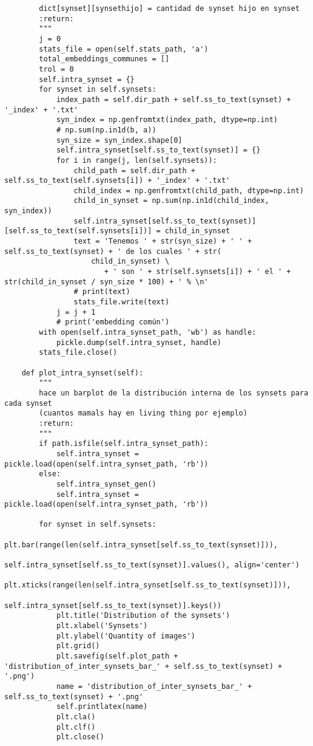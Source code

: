 \documentclass[12,twoside]{TFG-GM}
\theoremstyle{definition}
\theoremstyle{remark}
\begin{document}
\begin{verbatim}
        dict[synset][synsethijo] = cantidad de synset hijo en synset
        :return:
        """
        j = 0
        stats_file = open(self.stats_path, 'a')
        total_embeddings_communes = []
        trol = 0
        self.intra_synset = {}
        for synset in self.synsets:
            index_path = self.dir_path + self.ss_to_text(synset) + '_index' + '.txt'
            syn_index = np.genfromtxt(index_path, dtype=np.int)
            # np.sum(np.in1d(b, a))
            syn_size = syn_index.shape[0]
            self.intra_synset[self.ss_to_text(synset)] = {}
            for i in range(j, len(self.synsets)):
                child_path = self.dir_path + self.ss_to_text(self.synsets[i]) + '_index' + '.txt'
                child_index = np.genfromtxt(child_path, dtype=np.int)
                child_in_synset = np.sum(np.in1d(child_index, syn_index))
                self.intra_synset[self.ss_to_text(synset)][self.ss_to_text(self.synsets[i])] = child_in_synset
                text = 'Tenemos ' + str(syn_size) + ' ' + self.ss_to_text(synset) + ' de los cuales ' + str(
                    child_in_synset) \
                       + ' son ' + str(self.synsets[i]) + ' el ' + str(child_in_synset / syn_size * 100) + ' % \n'
                # print(text)
                stats_file.write(text)
            j = j + 1
            # print('embedding común')
        with open(self.intra_synset_path, 'wb') as handle:
            pickle.dump(self.intra_synset, handle)
        stats_file.close()

    def plot_intra_synset(self):
        """
        hace un barplot de la distribución interna de los synsets para cada synset
        (cuantos mamals hay en living thing por ejemplo)
        :return:
        """
        if path.isfile(self.intra_synset_path):
            self.intra_synset = pickle.load(open(self.intra_synset_path, 'rb'))
        else:
            self.intra_synset_gen()
            self.intra_synset = pickle.load(open(self.intra_synset_path, 'rb'))

        for synset in self.synsets:
            plt.bar(range(len(self.intra_synset[self.ss_to_text(synset)])),
                    self.intra_synset[self.ss_to_text(synset)].values(), align='center')
            plt.xticks(range(len(self.intra_synset[self.ss_to_text(synset)])),
                       self.intra_synset[self.ss_to_text(synset)].keys())
            plt.title('Distribution of the synsets')
            plt.xlabel('Synsets')
            plt.ylabel('Quantity of images')
            plt.grid()
            plt.savefig(self.plot_path + 'distribution_of_inter_synsets_bar_' + self.ss_to_text(synset) + '.png')
            name = 'distribution_of_inter_synsets_bar_' + self.ss_to_text(synset) + '.png'
            self.printlatex(name)
            plt.cla()
            plt.clf()
            plt.close()


\end{verbatim}
\end{document}
